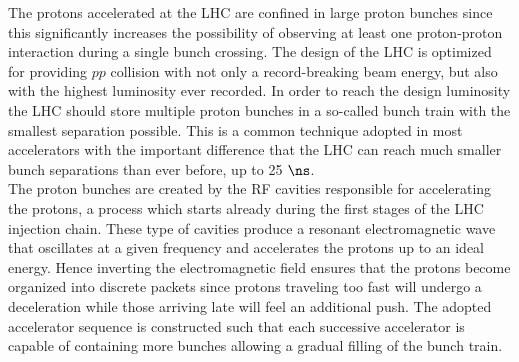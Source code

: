 The protons accelerated at the LHC are confined in large proton bunches since this significantly increases the possibility of observing at least one proton-proton interaction during a single bunch crossing. 
The design of the LHC is optimized for providing $pp$ collision with not only a record-breaking beam energy, but also with the highest luminosity ever recorded. In order to reach the design luminosity the LHC should store multiple proton bunches in a so-called bunch train with the smallest separation possible. 
This is a common technique adopted in most accelerators with the important difference that the LHC can reach much smaller bunch separations than ever before, up to 25 $\ns$.
\\
The proton bunches are created by the RF cavities responsible for accelerating the protons, a process which starts already during the first stages of the LHC injection chain.
These type of cavities produce a resonant electromagnetic wave that oscillates at a given frequency and accelerates the protons up to an ideal energy.
Hence inverting the electromagnetic field ensures that the protons become organized into discrete packets since protons traveling too fast will undergo a deceleration while those arriving late will feel an additional push.
The adopted accelerator sequence is constructed such that each successive accelerator is capable of containing more bunches allowing a gradual filling of the bunch train.

